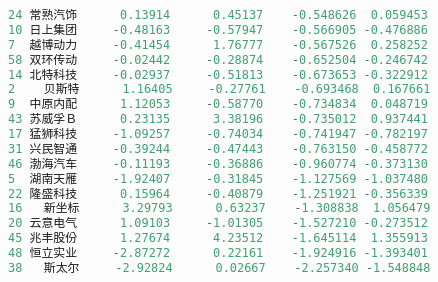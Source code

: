 \documentclass[11pt,a4paper,oneside]{book}
\begin{document}
\begin{lstlisting}[language=r]
24 常熟汽饰      0.13914      0.45137    -0.548626  0.059453
10 日上集团     -0.48163     -0.57947    -0.566905 -0.476886
7  越博动力     -0.41454      1.76777    -0.567526  0.258252
58 双环传动     -0.02442     -0.28874    -0.652504 -0.246742
14 北特科技     -0.02937     -0.51813    -0.673653 -0.322912
2    贝斯特      1.16405     -0.27761    -0.693468  0.167661
9  中原内配      1.12053     -0.58770    -0.734834  0.048719
43 苏威孚Ｂ      0.23135      3.38196    -0.735012  0.937441
17 猛狮科技     -1.09257     -0.74034    -0.741947 -0.782197
31 兴民智通     -0.39244     -0.47443    -0.763150 -0.458772
46 渤海汽车     -0.11193     -0.36886    -0.960774 -0.373130
5  湖南天雁     -1.92407     -0.31845    -1.127569 -1.037480
22 隆盛科技      0.15964     -0.40879    -1.251921 -0.356339
16   新坐标      3.29793      0.63237    -1.308838  1.056479
20 云意电气      1.09103     -1.01305    -1.527210 -0.273512
45 兆丰股份      1.27674      4.23512    -1.645114  1.355913
48 恒立实业     -2.87272      0.22161    -1.924916 -1.393401
38   斯太尔     -2.92824      0.02667    -2.257340 -1.548848


\end{lstlisting}
\end{document}
